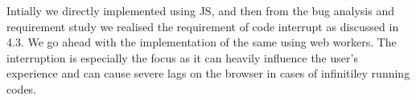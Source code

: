 Intially we directly implemented using JS, and then from the bug analysis and requirement study we realised the requirement of code interrupt as discussed in 4.3. We go ahead with the implementation of the same using web workers.
The interruption is especially the focus as it can heavily influence the user's experience and can cause severe lags on the browser in cases of infinitiley running codes.
